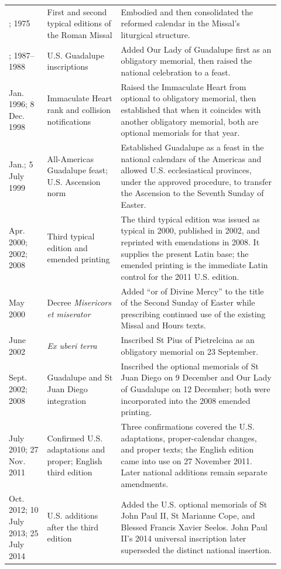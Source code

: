 \begin{longtable}{>{\raggedright\arraybackslash}p{0.13\linewidth}>{\raggedright\arraybackslash}p{0.25\linewidth}>{\raggedright\arraybackslash}p{0.54\linewidth}}
1970; 1975 & First and second typical editions of the Roman Missal & Embodied and then consolidated the reformed calendar in the Missal's liturgical structure.\\
1971; 1987--1988 & U.S. Guadalupe inscriptions & Added Our Lady of Guadalupe first as an obligatory memorial, then raised the national celebration to a feast.\\
1 Jan. 1996; 8 Dec. 1998 & Immaculate Heart rank and collision notifications & Raised the Immaculate Heart from optional to obligatory memorial, then established that when it coincides with another obligatory memorial, both are optional memorials for that year.\\
22 Jan.; 5 July 1999 & All-Americas Guadalupe feast; U.S. Ascension norm & Established Guadalupe as a feast in the national calendars of the Americas and allowed U.S. ecclesiastical provinces, under the approved procedure, to transfer the Ascension to the Seventh Sunday of Easter.\\
20 Apr. 2000; 2002; 2008 & Third typical edition and emended printing & The third typical edition was issued as typical in 2000, published in 2002, and reprinted with emendations in 2008. It supplies the present Latin base; the emended printing is the immediate Latin control for the 2011 U.S. edition.\\
5 May 2000 & Decree \emph{Misericors et miserator} & Added “or of Divine Mercy” to the title of the Second Sunday of Easter while prescribing continued use of the existing Missal and Hours texts.\\
26 June 2002 & \emph{Ex uberi terra} & Inscribed St Pius of Pietrelcina as an obligatory memorial on 23 September.\\
28 Sept. 2002; 2008 & Guadalupe and St Juan Diego integration & Inscribed the optional memorials of St Juan Diego on 9 December and Our Lady of Guadalupe on 12 December; both were incorporated into the 2008 emended printing.\\
24 July 2010; 27 Nov. 2011 & Confirmed U.S. adaptations and proper; English third edition & Three confirmations covered the U.S. adaptations, proper-calendar changes, and proper texts; the English edition came into use on 27 November 2011. Later national additions remain separate amendments.\\
12 Oct. 2012; 10 July 2013; 25 July 2014 & U.S. additions after the third edition & Added the U.S. optional memorials of St John Paul II, St Marianne Cope, and Blessed Francis Xavier Seelos. John Paul II's 2014 universal inscription later superseded the distinct national insertion.\\

\end{longtable}
